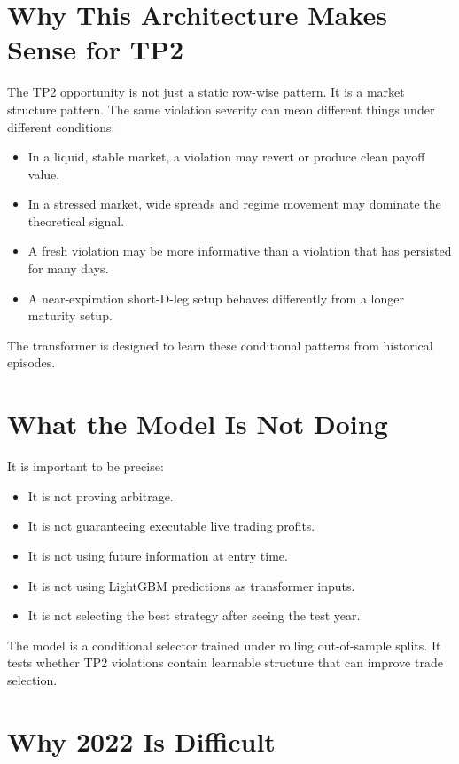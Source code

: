 \documentclass[11pt]{article}
\newcommand{\1}{\mathbf{1}}
\begin{document}
\section{Why This Architecture Makes Sense for TP2}

The TP2 opportunity is not just a static row-wise pattern. It is a market
structure pattern. The same violation severity can mean different things under
different conditions:

\begin{itemize}[leftmargin=*]
  \item In a liquid, stable market, a violation may revert or produce clean
        payoff value.
  \item In a stressed market, wide spreads and regime movement may dominate
        the theoretical signal.
  \item A fresh violation may be more informative than a violation that has
        persisted for many days.
  \item A near-expiration short-D-leg setup behaves differently from a longer
        maturity setup.
\end{itemize}

The transformer is designed to learn these conditional patterns from historical
episodes.

\section{What the Model Is Not Doing}

It is important to be precise:

\begin{itemize}[leftmargin=*]
  \item It is not proving arbitrage.
  \item It is not guaranteeing executable live trading profits.
  \item It is not using future information at entry time.
  \item It is not using LightGBM predictions as transformer inputs.
  \item It is not selecting the best strategy after seeing the test year.
\end{itemize}

The model is a conditional selector trained under rolling out-of-sample splits.
It tests whether TP2 violations contain learnable structure that can improve
trade selection.

\section{Why 2022 Is Difficult}
\end{document}
